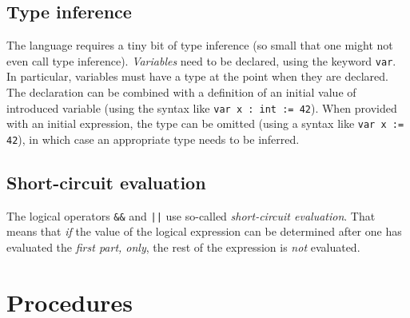 \documentclass[11pt]{article}
\begin{document}
\subsection{Type inference}
\label{sec:orgd141450}

The language requires a tiny bit of type inference (so small that one might
not even call type inference).  \emph{Variables} need to be declared, using the
keyword \texttt{var}. In particular, variables must have a type at the point when
they are declared. The declaration can be combined with a definition of an
initial value of introduced variable (using the syntax like \texttt{var x : int :=
42}). When provided with an initial expression, the type can be omitted
(using a syntax like \texttt{var x := 42}), in which case an appropriate type
needs to be inferred.

\subsection{Short-circuit evaluation}
\label{sec:org01bb3bc}

The logical operators \texttt{\&\&} and \texttt{||} use so-called \emph{short-circuit
evaluation}. That means that \emph{if} the value of the logical expression can
be determined after one has evaluated the \emph{first part, only}, the rest of
the expression is \emph{not} evaluated.

\section{Procedures}
\label{sec:org5157e7a}
\end{document}
